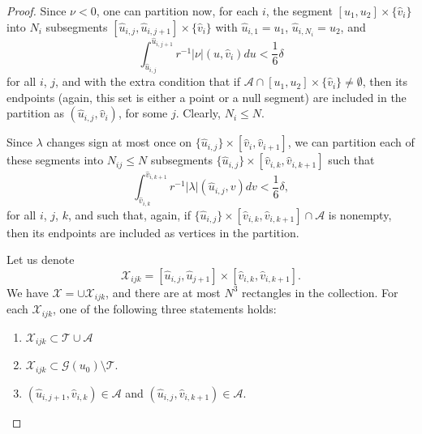 \documentclass{article}
\begin{document}
{\begin{proof}
Since $\nu<0$, one can 
partition now, for each $i$, the segment
$[u_1,u_2]\times\{\hat{v}_i\}$ into $N_i$ subsegments
$[\hat{u}_{i,j},\hat{u}_{i,j+1}]\times\{\hat{v}_i\}$ with
$\hat{u}_{i,1}=u_1$, $\hat{u}_{i,N_i}=u_2$,
and
\[
\int_{\hat{u}_{i,j}}^{\hat{u}_{i,j+1}}{r^{-1}|\nu|(u,\hat{v}_i)du}<\frac16\delta
\]
for all $i$, $j$,
and with the extra condition that if 
$\mathcal{A}\cap[u_1,u_2]\times\{\hat{v}_i\}\ne\emptyset$,
then its endpoints (again, this set is either a point or a null segment)
are included in the partition as
$(\hat{u}_{i,j},\hat{v}_i)$,
for some $j$. Clearly, $N_i\le N$.

Since $\lambda$ changes sign at most 
once on $\{\hat{u}_{i,j}\}\times[\hat{v}_i,\hat{v}_{i+1}]$, we can partition
each of these segments
into $N_{ij}\le N$ subsegments $\{\hat{u}_{i,j}\}\times[\hat{v}_{i,k},\hat{v}_{i,k+1}]$
such that
\[
\int_{\hat{v}_{i,k}}^{\hat{v}_{i,k+1}}{r^{-1}|\lambda|(\hat{u}_{i,j},v)dv}
<\frac16\delta,
\]
for all $i$, $j$, $k$,
and such that, again,
if $\{\hat{u}_{i,j}\}\times[\hat{v}_{i,k},\hat{v}_{i,k+1}]\cap\mathcal{A}$ is
nonempty, then its endpoints are included as vertices in the partition.


Let us denote 
\[
\mathcal{X}_{ijk}=[\hat{u}_{i,j},\hat{u}_{j+1}]\times[\hat{v}_{i,k},\hat{v}_{i,k+1}].
\]
We have $\mathcal{X}=\cup\mathcal{X}_{ijk}$, and there
are at most $N^3$ rectangles in the collection.
For each $\mathcal{X}_{ijk}$, one of the following three statements
holds:
\begin{enumerate}
\item
$\mathcal{X}_{ijk}\subset\mathcal{T}\cup\mathcal{A}$ 
\item
$\mathcal{X}_{ijk}\subset\mathcal{G}(u_0)\setminus\mathcal{T}$.
\item
$(\hat{u}_{i,j+1},\hat{v}_{i,k})\in\mathcal{A}$
and $(\hat{u}_{i,j},\hat{v}_{i,k+1})\in\mathcal{A}$.
\end{enumerate}



\end{proof}}
\end{document}
